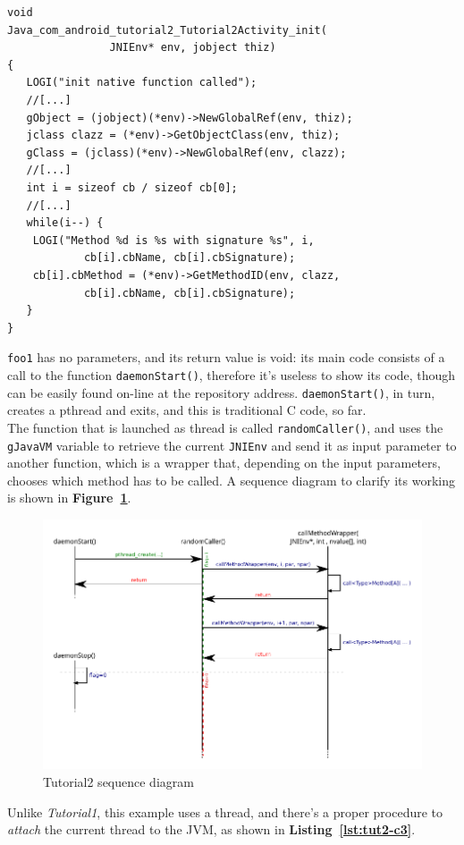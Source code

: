\documentclass[a4paper,10pt]{article}
\newcommand{\keyword}[1]{\texttt{#1}}
\newcommand{\reff}[1]{\textbf{Figure~\ref{#1}}}
\newcommand{\refl}[1]{\textbf{Listing~\ref{#1}}}
\begin{document}
\begin{multicols}{2}
\begin{lstlisting}
void
Java_com_android_tutorial2_Tutorial2Activity_init(
				JNIEnv* env, jobject thiz)
{
   LOGI("init native function called");   
   //[...]   
   gObject = (jobject)(*env)->NewGlobalRef(env, thiz);
   jclass clazz = (*env)->GetObjectClass(env, thiz);
   gClass = (jclass)(*env)->NewGlobalRef(env, clazz);   
   //[...]   
   int i = sizeof cb / sizeof cb[0];
   //[...]   
   while(i--) {
   	LOGI("Method %d is %s with signature %s", i,
   			cb[i].cbName, cb[i].cbSignature);
   	cb[i].cbMethod = (*env)->GetMethodID(env, clazz,
   			cb[i].cbName, cb[i].cbSignature);
   }
}
\end{lstlisting}
\keyword{foo1} has no parameters, and its return value is void: its main code consists of a call to the function \keyword{daemonStart()}, therefore it's useless to show its code, though can be easily found on-line at the repository address. \keyword{daemonStart()}, in turn, creates a pthread and exits, and this is traditional C code, so far.\\
The function that is launched as thread is called \keyword{randomCaller()}, and uses the \keyword{gJavaVM} variable to retrieve the current \keyword{JNIEnv} and send it as input parameter to another function, which is a wrapper that, depending on the input parameters, chooses which method has to be called. A sequence diagram to clarify its working is shown in \reff{fig:tut12-seq}.
\begin{figure}[t]
 \includegraphics[width=17cm]{./figures/sequence.pdf}
 \caption{Tutorial2 sequence diagram}
 \label{fig:tut12-seq}
\end{figure}
Unlike \textit{Tutorial1}, this example uses a thread, and there's a proper procedure to \textit{attach} the current thread to the JVM, as shown in \refl{lst:tut2-c3}.

\end{multicols}
\end{document}
